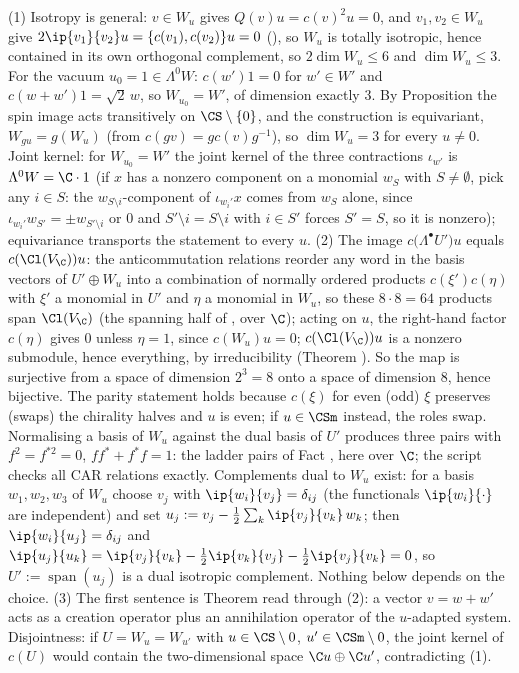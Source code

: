 (1) Isotropy is general: $v \in W_u$ gives $Q(v)u = c(v)^2u = 0$, and $v_1, v_2 \in W_u$ give $2\ip{v_1}{v_2}u = \{c(v_1), c(v_2)\}u = 0$ (), so $W_u$ is totally isotropic, hence contained in its own orthogonal complement, so $2\dim W_u \le 6$ and $\dim W_u \le 3$. For the vacuum $u_0 = 1 \in \Lambda^0 W$: $c(w')1 = 0$ for $w' \in W'$ and $c(w+w')1 = \sqrt2\,w$, so $W_{u_0} = W'$, of dimension exactly $3$. By Proposition  the spin image acts transitively on $\CS\setminus\{0\}$, and the construction is equivariant, $W_{gu} = g(W_u)$ (from $c(gv) = g c(v) g^{-1}$), so $\dim W_u = 3$ for every $u \neq 0$. Joint kernel: for $W_{u_0} = W'$ the joint kernel of the three contractions $\iota_{w'}$ is $\Lambda^0 W = \C\cdot 1$ (if $x$ has a nonzero component on a monomial $w_S$ with $S \neq \emptyset$, pick any $i \in S$: the $w_{S\setminus i}$-component of $\iota_{w_i'}x$ comes from $w_S$ alone, since $\iota_{w_i'}w_{S'} = \pm w_{S'\setminus i}$ or $0$ and $S'\setminus i = S\setminus i$ with $i \in S'$ forces $S' = S$, so it is nonzero); equivariance transports the statement to every $u$.
(2) The image $c\bigl(\Lambda^\bullet U'\bigr)u$ equals $c(\Cl(V_\C))u$: the anticommutation relations reorder any word in the basis vectors of $U' \oplus W_u$ into a combination of normally ordered products $c(\xi')c(\eta)$ with $\xi'$ a monomial in $U'$ and $\eta$ a monomial in $W_u$, so these $8\cdot 8 = 64$ products span $\Cl(V_\C)$ (the spanning half of , over $\C$); acting on $u$, the right-hand factor $c(\eta)$ gives $0$ unless $\eta = 1$, since $c(W_u)u = 0$; $c(\Cl(V_\C))u$ is a nonzero submodule, hence everything, by irreducibility (Theorem ). So the map is surjective from a space of dimension $2^3 = 8$ onto a space of dimension $8$, hence bijective. The parity statement holds because $c(\xi)$ for even (odd) $\xi$ preserves (swaps) the chirality halves and $u$ is even; if $u \in \CSm$ instead, the roles swap. Normalising a basis of $W_u$ against the dual basis of $U'$ produces three pairs with $f^2 = f^{*2} = 0$, $ff^* + f^*f = 1$: the ladder pairs of Fact , here over $\C$; the script checks all CAR relations exactly. Complements dual to $W_u$ exist: for a basis $w_1, w_2, w_3$ of $W_u$ choose $v_j$ with $\ip{w_i}{v_j} = \delta_{ij}$ (the functionals $\ip{w_i}{\cdot}$ are independent) and set $u_j := v_j - \tfrac12\sum_k \ip{v_j}{v_k}\,w_k$; then $\ip{w_i}{u_j} = \delta_{ij}$ and $\ip{u_j}{u_k} = \ip{v_j}{v_k} - \tfrac12\ip{v_k}{v_j} - \tfrac12\ip{v_j}{v_k} = 0$, so $U' := \operatorname{span}(u_j)$ is a dual isotropic complement. Nothing below depends on the choice.
(3) The first sentence is Theorem  read through (2): a vector $v = w + w'$ acts as a creation operator plus an annihilation operator of the $u$-adapted system. Disjointness: if $U = W_{u} = W_{u'}$ with $u \in \CS\setminus 0$, $u' \in \CSm\setminus 0$, the joint kernel of $c(U)$ would contain the two-dimensional space $\C u \oplus \C u'$, contradicting (1).
